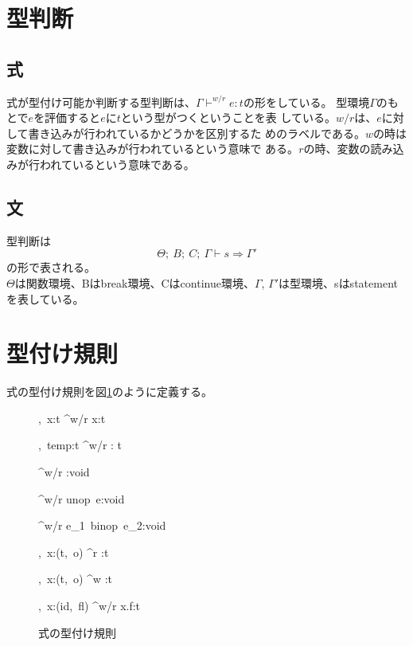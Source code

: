 \documentclass[a4j,proof]{jarticle}
\begin{document}
\section{型判断}
\subsection{式}
式が型付け可能か判断する型判断は、$\Gamma \vdash^{w/r} e:t$の形をしている。
型環境$\Gamma$のもとで$e$を評価すると$e$に$t$という型がつくということを表
している。$w/r$は、$e$に対して書き込みが行われているかどうかを区別するた
めのラベルである。$w$の時は変数に対して書き込みが行われているという意味で
ある。$r$の時、変数の読み込みが行われているという意味である。

\subsection{文}
型判断は
\[
\Theta;\ B;\ C;\ \Gamma \vdash s \Rightarrow \Gamma'
\]
の形で表される。\\
$\Theta$は関数環境、Bはbreak環境、Cはcontinue環境、$\Gamma$, $\Gamma'$は型環境、sはstatementを表している。


\section{型付け規則}
式の型付け規則を図\ref{typing_expr}のように定義する。

\begin{figure}[htbp]
  \infrule[Evar]{
  }
  {
  \Gamma,\ x:t \vdash^{w/r} x:t
  }

  \infrule[Etemp]{
  }
  {
  \Gamma,\ temp:t \vdash^{w/r} : t
  }

  \infrule[Econst]{
  }
  {
  \Gamma \vdash^{w/r} :void
  }


  {
  \Gamma \vdash^{w/r} unop\ e:void
  }

  {
  \Gamma \vdash^{w/r} e_{1}\ binop\ e_{2}:void
  }

  {
  \Gamma,\ x:(t,\ o) \vdash^{r} :t
  }

  {
  \Gamma,\ x:(t,\ o) \vdash^{w} :t
  }

  {
  \Gamma,\ x:(id,\ fl) \vdash^{w/r} x.f:t
  }
  \caption{式の型付け規則}
  \label{typing_expr}
\end{figure}
\end{document}

